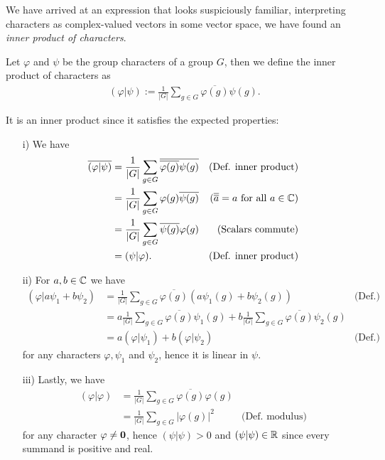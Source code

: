We have arrived at an expression that looks suspiciously familiar, interpreting characters as complex-valued vectors in some vector space, we have found an \textit{inner product of characters}.

\begin{definition}
	Let $\varphi$ and $\psi$ be the group characters of a group $G$, then we define the inner product of characters as
	\begin{align*}
		(\varphi | \psi) := \frac{1}{|G|} \sum_{g \in G} \overline{\varphi(g)} {\psi(g)}.
	\end{align*}
\end{definition}

It is an inner product since it satisfies the expected properties:
\begin{enumerate}
	\item[i)] We have 
	\begin{align*}
		\overline{(\varphi|\psi)} &= \frac{1}{|G|} \sum_{g \in G} \overline{\overline{\varphi(g)} {\psi(g)}} & \text{(Def. inner product)}\\
		&= \frac{1}{|G|} \sum_{g \in G} \varphi(g) \overline{\psi(g)} & \text{($\overline{\overline{a}}=a$ for all $a \in \mathbb{C}$)}\\
		&= \frac{1}{|G|} \sum_{g \in G} \overline{\psi(g)} {\varphi(g)} & \text{(Scalars commute)}\\
		&= (\psi|\varphi). &\text{(Def. inner product)}
	\end{align*}
	\item[ii)] For $a,b \in \mathbb{C}$ we have 
	\begin{align*}
		(\varphi | a\psi_1 + b\psi_2) &= \frac{1}{|G|} \sum_{g \in G} \overline{\varphi(g)} \left({a\psi_1(g) + b\psi_2(g)}\right) & \text{(Def.)}\\
		&= a\frac{1}{|G|} \sum_{g \in G} \overline{\varphi(g)} {\psi_1(g)}  +b \frac{1}{|G|} \sum_{g \in G} \overline{\varphi(g)} {\psi_2(g)}  \\
		&= a(\varphi | \psi_1 )  +b (\varphi |\psi_2) & \text{(Def.)}
	\end{align*}
	for any characters $\varphi, \psi_1$ and $\psi_2$, hence it is linear in $\psi$.
	\item[iii)] Lastly, we have 
	\begin{align*}
		(\varphi|\varphi) &= \frac{1}{|G|} \sum_{g \in G} \overline{\varphi(g)} {\varphi(g)} \\
		&= \frac{1}{|G|} \sum_{g \in G} |\varphi(g)|^2 & \text{(Def. modulus)}
	\end{align*}
	for any character $\varphi \neq \mathbf{0}$, hence $(\psi|\psi) > 0$ and $(\psi|\psi) \in \mathbb{R}$ since every summand is positive and real.
\end{enumerate}

